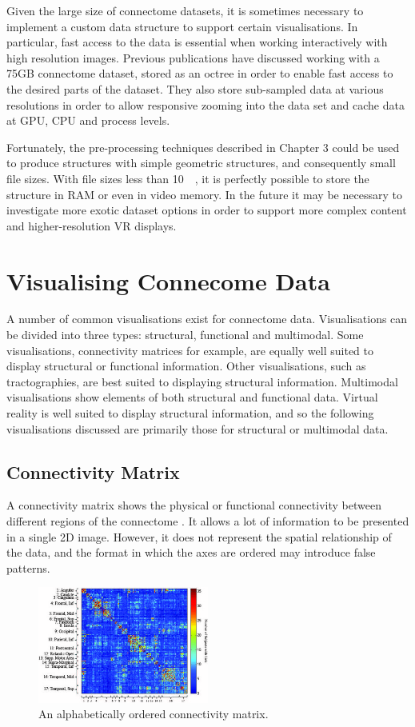 \documentclass[MSc,paper=a4,pagesize=auto]{icldt}
\begin{document}
Given the large size of connectome datasets, it is sometimes necessary to implement a custom data structure to support certain visualisations. In particular, fast access to the data is essential when working interactively with high resolution images. Previous publications \cite{Jeong2010} have discussed working with a 75GB connectome dataset, stored as an octree in order to enable fast access to the desired parts of the dataset. They also store sub-sampled data at various resolutions in order to allow responsive zooming into the data set and cache data at GPU, CPU and process levels. 

Fortunately, the pre-processing techniques described in Chapter 3 could be used to produce structures with simple geometric structures, and consequently small file sizes. With file sizes less than \SI{10}{\mega\byte}, it is perfectly possible to store the structure in RAM or even in video memory. In the future it may be necessary to investigate more exotic dataset options in order to support more complex content and higher-resolution VR displays.


\section{Visualising Connecome Data}
A number of common visualisations exist for connectome data. Visualisations can be divided into three types: structural, functional and multimodal. Some visualisations, connectivity matrices for example, are equally well suited to display structural or functional information. Other visualisations, such as tractographies, are best suited to displaying structural information. Multimodal visualisations show elements of both structural and functional data. Virtual reality is well suited to display structural information, and so the following visualisations discussed are primarily those for structural or multimodal data.

\subsection{Connectivity Matrix}
A connectivity matrix shows the physical or functional connectivity between different regions of the connectome \cite{Wang2011}. It allows a lot of information to be presented in a single 2D image. However, it does not represent the spatial relationship of the data, and the format in which the axes are ordered may introduce false patterns. 

\begin{figure}[htbp!]
    \centering
    \includegraphics[width=0.5\textwidth]{resources/connectivity_matrix}
    \caption{An alphabetically ordered connectivity matrix. \cite{Wang2011}}
    \label{fig:connectivity_matrix}
\end{figure}
\end{document}
